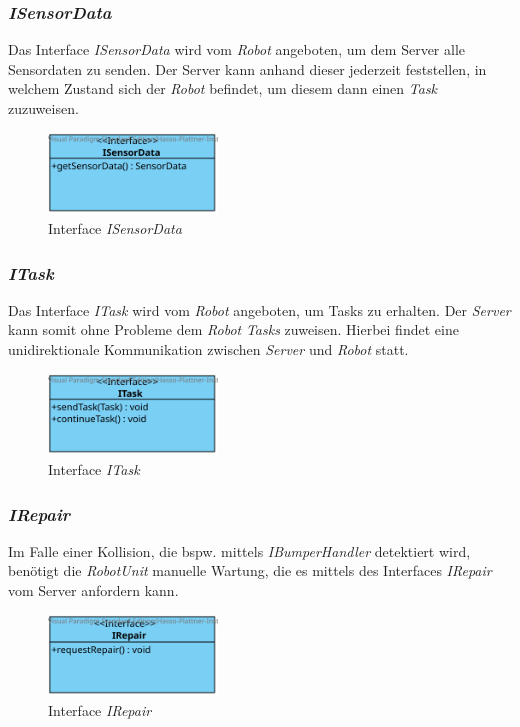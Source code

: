 	\subsubsection{\textit{ISensorData}}
	Das Interface \textit{ISensorData} wird vom \textit{Robot} angeboten, um dem Server alle Sensordaten zu senden. 
	Der Server kann anhand dieser jederzeit feststellen, in welchem Zustand sich der \textit{Robot} befindet, um diesem dann einen \textit{Task} zuzuweisen.
	\begin{figure}[H]
	\centering
	\includegraphics[width=0.4\textwidth]{img/1-Entwurf-3-1_ISensorData}
	\caption{Interface \emph{ISensorData}}
	\label{ISensorData}
	\end{figure}

	\subsubsection{\textit{ITask}}
	Das Interface \textit{ITask} wird vom \textit{Robot} angeboten, um Tasks zu erhalten. 
	Der \emph{Server} kann somit ohne Probleme dem \textit{Robot} \textit{Tasks} zuweisen. 
	Hierbei findet eine unidirektionale Kommunikation zwischen \emph{Server} und \emph{Robot} statt.
	\begin{figure}[H]
	\centering
	\includegraphics[width=0.4\textwidth]{img/1-Entwurf-3-1_ITask}
	\caption{Interface \emph{ITask}}
	\label{ITask}
	\end{figure}
	
	\subsubsection{\textit{IRepair}}
	Im Falle einer Kollision, die bspw. mittels \textit{IBumperHandler} detektiert wird, benötigt die \textit{RobotUnit} manuelle Wartung, die es mittels des Interfaces \textit{IRepair} vom Server anfordern kann.
	\begin{figure}[H]
	\centering
	\includegraphics[width=0.4\textwidth]{img/2-Entwurf-3-IRepair}
	\caption{Interface \emph{IRepair}}
	\label{IRepair}
	\end{figure}
		
